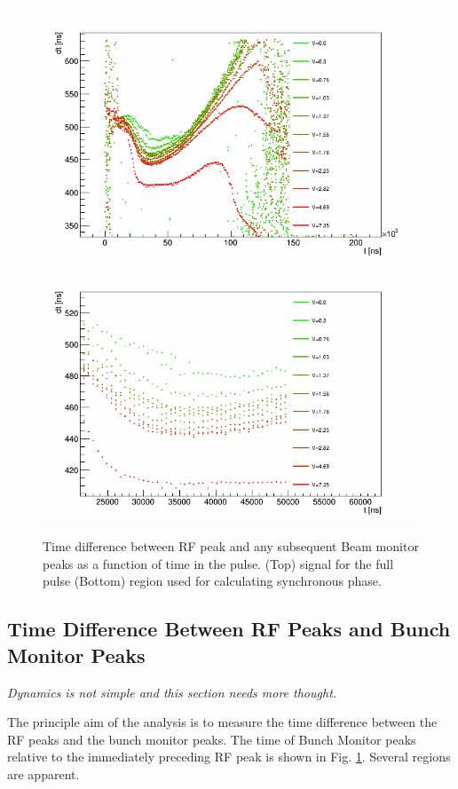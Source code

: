 \documentclass{paper}
\begin{document}
\begin{figure}
	\centering
		\includegraphics[width=\textwidth]{images/bpm_to_rf_deltas}
		\includegraphics[width=\textwidth]{images/bpm_to_rf_deltas_zoom}
	\caption{Time difference between RF peak and any subsequent Beam monitor peaks
           as a function of time in the pulse. (Top) signal for the full pulse
           (Bottom) region used for calculating synchronous phase.}
	\label{fig:delta_rf_vs_bpm}
\end{figure}

\subsection{Time Difference Between RF Peaks and Bunch Monitor Peaks}
\emph{Dynamics is not simple and this section needs more thought.}

The principle aim of the analysis is to measure the time difference between the
RF peaks and the bunch monitor peaks. The time of Bunch Monitor peaks relative
to the immediately preceding RF peak is shown in Fig. \ref{fig:delta_rf_vs_bpm}.
Several regions are apparent. 
\end{document}
